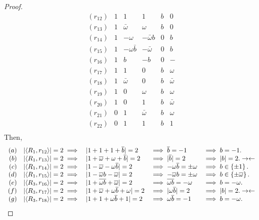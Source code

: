 \begin{lemma}
\begin{proof}
     $$
     \begin{array}{rccccc}
	(r_{12})  & 1 & 1         & 1         & b       & 0 \\
	(r_{13})  & 1 & \bar{\omega}   & \omega        & b       & 0 \\
	(r_{14})  & 1 & -\omega        & -\bar{\omega}b & 0       & b \\
	(r_{15})  & 1 & -\omega\bar{b} & -\bar{\omega}  & 0       & b \\
	(r_{16})  & 1 & b         & -b        & 0       & - \\
	(r_{17})  & 1 & 1         & 0         & b       & \omega  \\
	(r_{18})  & 1 & \bar{\omega}   & 0         & b       & \bar{\omega} \\
	(r_{19})  & 1 & 0         & \omega        & b       & \omega  \\
	(r_{20})  & 1 & 0         & 1         & b       & \bar{\omega} \\
	(r_{21})  & 0 & 1         & \bar{\omega}   & b       & \omega  \\
	(r_{22})  & 0 & 1         & 1         & b       & 1 \\
     \end{array}
     $$
Then,
     $$
     \begin{array}{rcllll}
      (a) & \unb1{12} \implies & |1+1+1+\bar{b}|=2             &\implies \bar{b}=-1             &\implies b = -1.          \\
      (b) & \unb1{13} \implies & |1+\bar{\omega}+\omega+\bar{b}|=2       &\implies |\bar{b}|=2            &\implies |b| = 2.   \con \\
      (c) & \unb1{14} \implies & |1-\bar{\omega}-\omega\bar{b}|=2        &\implies -\omega\bar{b} = \pm\omega      &\implies b \in \left\{ \pm1\right\}.        \\
      (d) & \unb1{15} \implies & |1-\bar{\omega}b-\bar{\omega}|=2        &\implies -\bar{\omega}b=\pm\omega        &\implies b \in \left\{ \pm\bar{\omega}\right\}. \\
      (e) & \unb3{16} \implies & |1+\overline{\omega b}+\bar{\omega}|=2   &\implies \overline{\omega b} = -\omega     &\implies b = -\omega.           \\
      (f) & \unb3{17} \implies & |1+\bar{\omega}+\omega\bar{b}+\omega|=2      &\implies |\omega\bar{b}|=2           &\implies |b|=2.     \con \\
      (g) & \unb3{18} \implies & |1+1+\omega\bar{b}+1|=2            &\implies \omega\bar{b} = -1          &\implies b = -\omega.          \\

\end{array}$$
\end{proof}
\end{lemma}
